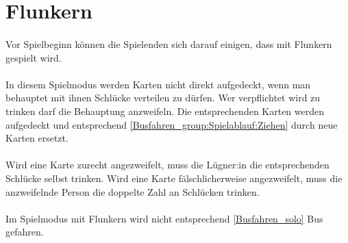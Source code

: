 \section{Flunkern}
\paragraph{}
Vor Spielbeginn können die Spielenden sich darauf einigen, dass mit Flunkern gespielt wird.

\paragraph{}
In diesem Spielmodus werden Karten nicht direkt aufgedeckt, wenn man behauptet mit ihnen Schlücke verteilen zu dürfen.
Wer verpflichtet wird zu trinken darf die Behauptung anzweifeln.
Die entsprechenden Karten werden aufgedeckt und entsprechend \ref{Busfahren_group:Spielablauf:Ziehen} durch neue Karten ersetzt.

\paragraph{}
Wird eine Karte zurecht angezweifelt, muss die Lügner:in die entsprechenden Schlücke selbst trinken.
Wird eine Karte fälschlicherweise angezweifelt, muss die anzweifelnde Person die doppelte Zahl an Schlücken trinken.

\paragraph{}
Im Spielmodus mit Flunkern wird nicht entsprechend \ref{Busfahren_solo} Bus gefahren.